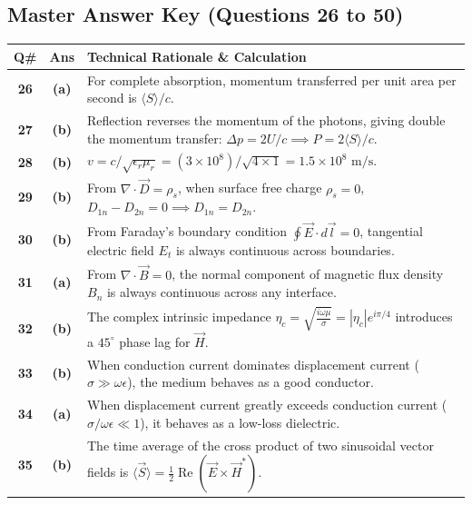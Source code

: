 \newpage

\subsection*{Master Answer Key (Questions 26 to 50)}

{\small
\noindent\begin{tabularx}{\textwidth}{|c|c|X|}
\hline
\textbf{Q\#} & \textbf{Ans} & \textbf{Technical Rationale \& Calculation} \\
\hline
\textbf{26} & \textbf{(a)} & For complete absorption, momentum transferred per unit area per second is $\langle S \rangle / c$. \\ \hline
\textbf{27} & \textbf{(b)} & Reflection reverses the momentum of the photons, giving double the momentum transfer: $\Delta p = 2U/c \implies P = 2\langle S \rangle/c$. \\ \hline
\textbf{28} & \textbf{(b)} & $v = c/\sqrt{\epsilon_r \mu_r} = (3 \times 10^8)/\sqrt{4 \times 1} = 1.5 \times 10^8\text{ m/s}$. \\ \hline
\textbf{29} & \textbf{(b)} & From $\nabla \cdot \vec{D} = \rho_s$, when surface free charge $\rho_s = 0$, $D_{1n} - D_{2n} = 0 \implies D_{1n} = D_{2n}$. \\ \hline
\textbf{30} & \textbf{(b)} & From Faraday's boundary condition $\oint \vec{E}\cdot d\vec{l} = 0$, tangential electric field $E_t$ is always continuous across boundaries. \\ \hline
\textbf{31} & \textbf{(a)} & From $\nabla \cdot \vec{B} = 0$, the normal component of magnetic flux density $B_n$ is always continuous across any interface. \\ \hline
\textbf{32} & \textbf{(b)} & The complex intrinsic impedance $\eta_c = \sqrt{\frac{i\omega\mu}{\sigma}} = |\eta_c| e^{i\pi/4}$ introduces a $45^\circ$ phase lag for $\vec{H}$. \\ \hline
\textbf{33} & \textbf{(b)} & When conduction current dominates displacement current ($\sigma \gg \omega\epsilon$), the medium behaves as a good conductor. \\ \hline
\textbf{34} & \textbf{(a)} & When displacement current greatly exceeds conduction current ($\sigma/\omega\epsilon \ll 1$), it behaves as a low-loss dielectric. \\ \hline
\textbf{35} & \textbf{(b)} & The time average of the cross product of two sinusoidal vector fields is $\langle \vec{S} \rangle = \frac{1}{2}\operatorname{Re}(\vec{E} \times \vec{H}^*)$. \\ \hline

\end{tabularx}}
